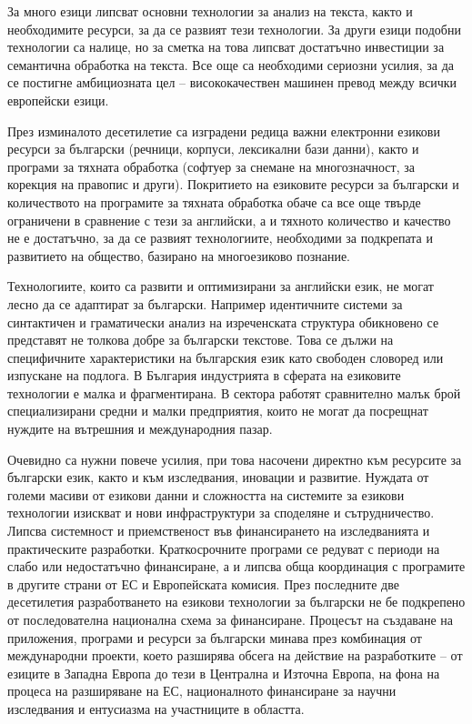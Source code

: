\begin{multicols}{2}
  За много езици липсват основни технологии за анализ на текста, както и
  необходимите ресурси, за да се развият тези технологии. За други езици
  подобни технологии са налице, но за сметка на това липсват достатъчно
  инвестиции за семантична обработка на текста. Все още са необходими
  сериозни усилия, за да се постигне амбициозната цел -- висококачествен
  машинен превод между всички европейски езици.

  През изминалото десетилетие са изградени редица важни електронни
  езикови ресурси за български (речници, корпуси, лексикални бази
  данни), както и програми за тяхната обработка (софтуер за снемане на
  многозначност, за корекция на правопис и други). Покритието на
  езиковите ресурси за български и количеството на програмите за тяхната
  обработка обаче са все още твърде ограничени в сравнение с тези за
  английски, а и тяхното количество и качество не е достатъчно, за да се
  развият технологиите, необходими за подкрепата и развитието на общество,
  базирано на многоезиково познание.

  Технологиите, които са развити и оптимизирани за английски език, не
  могат лесно да се адаптират за български. Например идентичните системи
  за синтактичен и граматически анализ на изреченската структура
  обикновено се представят не толкова добре за български текстове. Това
  се дължи на специфичните характеристики на българския език като
  свободен словоред или изпускане на подлога.  В България индустрията
  в сферата на езиковите технологии е малка и фрагментирана. В сектора
  работят сравнително малък брой специализирани средни и малки
  предприятия, които не могат да посрещнат нуждите на вътрешния и
  международния пазар.

  Очевидно са нужни повече усилия, при това насочени директно към
  ресурсите за български език, както и към изследвания, иновации и
  развитие.  Нуждата от големи масиви от езикови данни и сложността на
  системите за езикови технологии изискват и нови инфраструктури за
  споделяне и сътрудничество.
  Липсва системност и приемственост във финансирането на изследванията и
  практическите разработки. Краткосрочните програми се редуват с периоди
  на слабо или недостатъчно финансиране, а и липсва обща координация с
  програмите в другите страни от ЕС и Европейската комисия.  През
  последните две десетилетия разработването на езикови технологии за
  български не бе подкрепено от последователна национална схема за
  финансиране. Процесът на създаване на приложения, програми и
  ресурси за български минава през комбинация от международни проекти,
  което разширява обсега на действие на разработките – от езиците в
  Западна Европа до тези в Централна и Източна Европа, на фона на
  процеса на разширяване на ЕС, националното финансиране за научни
  изследвания и ентусиазма на участниците в областта.


\end{multicols}
